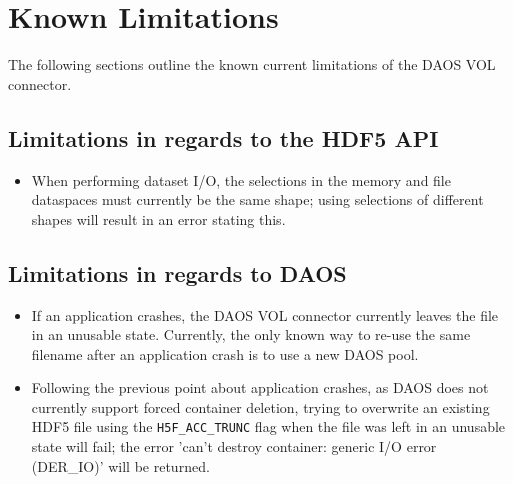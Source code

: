 \section{Known Limitations}

The following sections outline the known current limitations of the DAOS VOL connector.

\subsection{Limitations in regards to the HDF5 API}

\begin{itemize}
    \item When performing dataset I/O, the selections in the memory and file dataspaces must currently be the same shape; using selections of different shapes will result in an error stating this.

\end{itemize}

\subsection{Limitations in regards to DAOS}

\begin{itemize}
    \item If an application crashes, the DAOS VOL connector currently leaves the file in an unusable state. Currently, the only known way to re-use the same filename after an application crash is to use a new DAOS pool.
    \item Following the previous point about application crashes, as DAOS does not currently support forced container deletion, trying to overwrite an existing HDF5 file using the \texttt{H5F\_ACC\_TRUNC} flag when the file was left in an unusable state will fail; the error 'can't destroy container: generic I/O error (DER\_IO)' will be returned.
\end{itemize}